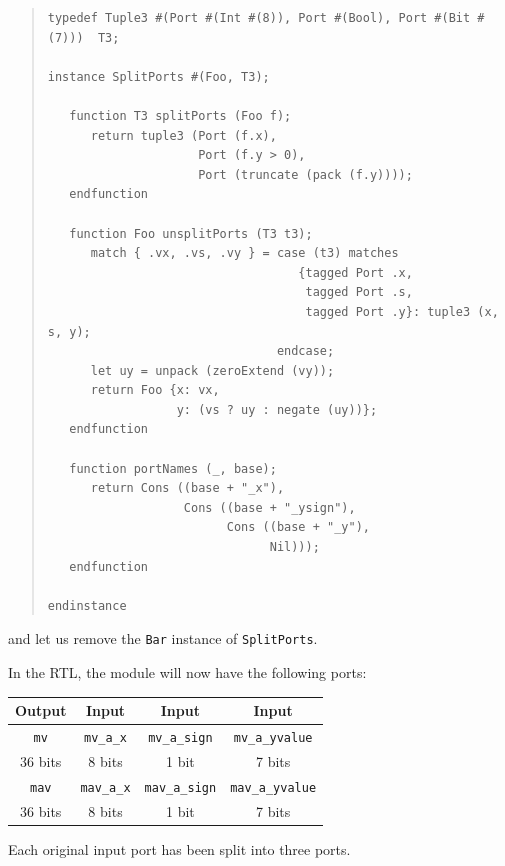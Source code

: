 \begin{quote}
\begin{verbatim}
typedef Tuple3 #(Port #(Int #(8)), Port #(Bool), Port #(Bit #(7)))  T3;

instance SplitPorts #(Foo, T3);

   function T3 splitPorts (Foo f);
      return tuple3 (Port (f.x),
                     Port (f.y > 0),
                     Port (truncate (pack (f.y))));
   endfunction

   function Foo unsplitPorts (T3 t3);
      match { .vx, .vs, .vy } = case (t3) matches
                                   {tagged Port .x,
                                    tagged Port .s,
                                    tagged Port .y}: tuple3 (x, s, y);
                                endcase;
      let uy = unpack (zeroExtend (vy));
      return Foo {x: vx,
                  y: (vs ? uy : negate (uy))};
   endfunction

   function portNames (_, base);
      return Cons ((base + "_x"),
                   Cons ((base + "_ysign"),
                         Cons ((base + "_y"),
                               Nil)));
   endfunction

endinstance
\end{verbatim}
\end{quote}

and let us remove the {\tt Bar} instance of {\tt SplitPorts}.

In the RTL, the module will now have the following ports:

\begin{center}
  \begin{tabular}{|c||c|c|c|}
    \hline
     Output &
     Input  &
     Input  &
     Input  \\
    \hline
     {\tt mv}            &
     {\tt mv\_a\_x}      &
     {\tt mv\_a\_sign}   &
     {\tt mv\_a\_yvalue} \\
     36 bits &
      8 bits &
      1 bit  &
      7 bits \\
    \hline
     {\tt mav}            &
     {\tt mav\_a\_x}      &
     {\tt mav\_a\_sign}   &
     {\tt mav\_a\_yvalue} \\
     36 bits &
      8 bits &
      1 bit  &
      7 bits \\
    \hline
  \end{tabular}
\end{center}

Each original input port has been split into three ports.


